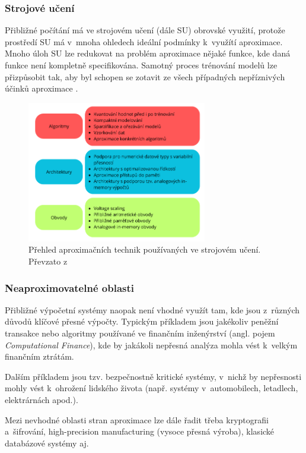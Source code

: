 \subsubsection{Strojové učení}
Přibližné počítání má ve strojovém učení (dále SU) obrovské využití, protože prostředí SU má v~mnoha ohledech ideální podmínky k~využítí aproximace. Mnoho úloh SU lze redukovat na problém aproximace nějaké funkce, kde daná funkce není kompletně specifikována. Samotný proces trénování modelů lze přizpůsobit tak, aby byl schopen se zotavit ze všech případných nepříznivých účinků aproximace \cite{approx_ai}.

\begin{figure}[H]
    \centering
    \includegraphics[width=0.7\textwidth]{obrazky-figures/ml.png}
    \caption{Přehled aproximačních technik používaných ve strojovém učení. Převzato z~\cite{approx_ai}}
    \label{fig:enter-label}
\end{figure}

\subsubsection{Neaproximovatelné oblasti}
Přibližné výpočetní systémy naopak není vhodné využít tam, kde jsou z~různých důvodů klíčové přesné výpočty. Typickým příkladem jsou jakékoliv peněžní transakce nebo algoritmy používané ve finančním inženýrství (angl. pojem \textit{Computational Finance}), kde by jakákoli nepřesná analýza mohla vést k~velkým finančním ztrátám.

Dalším příkladem jsou tzv. bezpečnostně kritické systémy, v~nichž by nepřesnosti mohly vést k~ohrožení lidského života (např. systémy v~automobilech, letadlech, elektrárnách apod.).

Mezi nevhodné oblasti stran aproximace lze dále řadit třeba kryptografii a~šifrování, high-precision manufacturing (vysoce přesná výroba), klasické databázové systémy aj.

